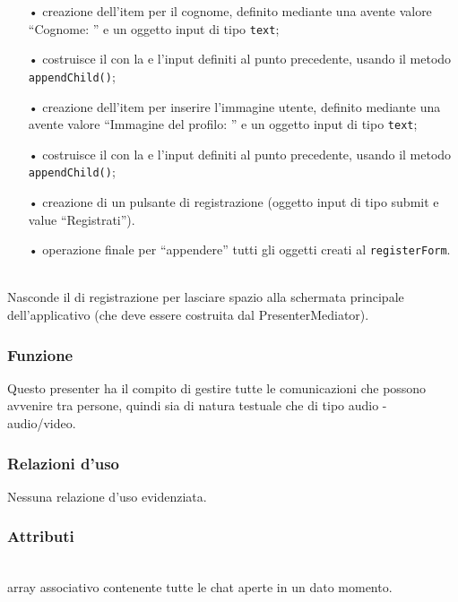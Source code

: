 \begin{description}
\begin{itemize}
		\item[•] creazione dell'item per il cognome, definito mediante una  avente valore ``Cognome: '' e un oggetto input di tipo \texttt{text};
		\item[•] costruisce il  con la  e l'input definiti al punto precedente, usando il metodo \texttt{appendChild()};
		\item[•] creazione dell'item per inserire l'immagine utente, definito mediante una  avente valore ``Immagine del profilo: '' e un oggetto input di tipo \texttt{text};
		\item[•] costruisce il  con la  e l'input definiti al punto precedente, usando il metodo \texttt{appendChild()};
		\item[•] creazione di un pulsante di registrazione (oggetto input di tipo submit e value ``Registrati'').
		\item[•] operazione finale per ``appendere'' tutti  gli oggetti creati al \texttt{registerForm}.
	\end{itemize}
	
	\item{}\\
	Nasconde il  di registrazione per lasciare spazio alla schermata principale dell'applicativo (che deve essere costruita dal PresenterMediator).

\end{description}


\subsubsection*{Funzione}
Questo presenter ha il compito di gestire tutte le comunicazioni che possono avvenire tra persone, quindi sia di natura testuale che di tipo audio - audio/video.

\subsubsection*{Relazioni d'uso}
Nessuna relazione d'uso evidenziata.

\subsubsection*{Attributi}
\begin{description}
\item{}\\
  array associativo contenente tutte le chat aperte in un dato momento.
\end{description}

